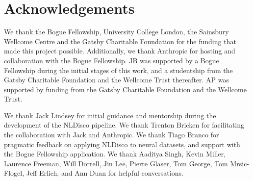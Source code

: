\section*{Acknowledgements}

We thank the Bogue Fellowship, University College London, the Sainsbury Wellcome Centre and the Gatsby Charitable Foundation for the funding that made this project possible. Additionally, we thank Anthropic for hosting and collaboration with the Bogue Fellowship. JB was supported by a Bogue Fellowship during the initial stages of this work, and a studentship from the Gatsby Charitable Foundation and the Wellcome Trust thereafter. AP was supported by funding from the Gatsby Charitable Foundation and the Wellcome Trust.

We thank Jack Lindsey for initial guidance and mentorship during the development of the NLDisco pipeline. We thank Trenton Bricken for facilitating the collaboration with Jack and Anthropic. We thank Tiago Branco for pragmatic feedback on applying NLDisco to neural datasets, and support with the Bogue Fellowship application. We thank Aaditya Singh, Kevin Miller, Laurence Freeman, Will Dorrell, Jin Lee, Pierre Glaser, Tom George, Tom Mrsic-Flogel, Jeff Erlich, and Ann Duan for helpful conversations.
